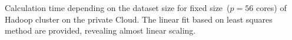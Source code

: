 \documentclass{article}
\begin{document}
\begin{center}

\end{center}
Calculation time depending on the dataset size for fixed size~($p=56$ cores) of Hadoop cluster on the private Cloud. The linear fit based on least squares method are provided, revealing almost linear scaling.
\end{document}

